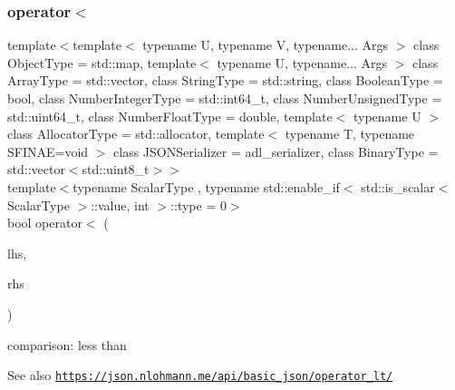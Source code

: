 \subsubsection{\texorpdfstring{operator$<$}{operator<}\hspace{0.1cm}{\footnotesize\ttfamily [3/3]}}
{\footnotesize\ttfamily template$<$template$<$ typename U, typename V, typename... Args $>$ class Object\+Type = std\+::map, template$<$ typename U, typename... Args $>$ class Array\+Type = std\+::vector, class String\+Type  = std\+::string, class Boolean\+Type  = bool, class Number\+Integer\+Type  = std\+::int64\+\_\+t, class Number\+Unsigned\+Type  = std\+::uint64\+\_\+t, class Number\+Float\+Type  = double, template$<$ typename U $>$ class Allocator\+Type = std\+::allocator, template$<$ typename T, typename S\+F\+I\+N\+A\+E=void $>$ class J\+S\+O\+N\+Serializer = adl\+\_\+serializer, class Binary\+Type  = std\+::vector$<$std\+::uint8\+\_\+t$>$$>$ \\
template$<$typename Scalar\+Type , typename std\+::enable\+\_\+if$<$ std\+::is\+\_\+scalar$<$ Scalar\+Type $>$\+::value, int $>$\+::type  = 0$>$ \\
bool operator$<$ (\begin{DoxyParamCaption}\item[{Scalar\+Type}]{lhs,  }\item[{\hyperlink{classnlohmann_1_1basic__json_ab8a1c33ee7b154fc41ca2545aa9724e6}{const\+\_\+reference}}]{rhs }\end{DoxyParamCaption})\hspace{0.3cm}{\ttfamily [friend]}}



comparison\+: less than 

\begin{DoxySeeAlso}{See also}
\href{https://json.nlohmann.me/api/basic_json/operator_lt/}{\tt https\+://json.\+nlohmann.\+me/api/basic\+\_\+json/operator\+\_\+lt/} 
\end{DoxySeeAlso}
\mbox{\label{classnlohmann_1_1basic__json_a5e34c5435e557d0bf666bd7311211405}} 
